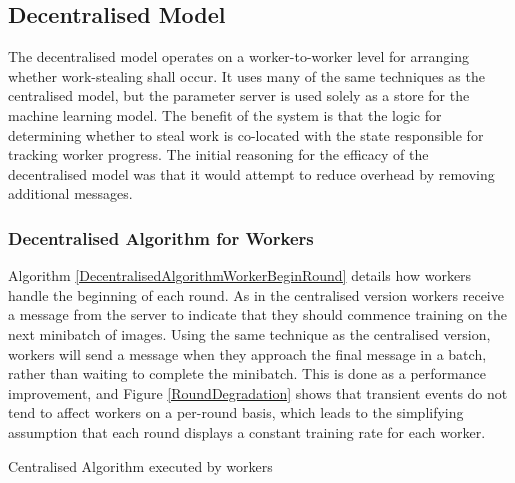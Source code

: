 \documentclass[12pt]{article}
\begin{document}
\subsection{Decentralised Model}
The decentralised model operates on a worker-to-worker level for arranging whether work-stealing shall occur. It uses many of the same techniques as the centralised model, but the parameter server is used solely as a store for the machine learning model.
\newline
The benefit of the system is that the logic for determining whether to steal work is co-located with the state responsible for tracking worker progress. The initial reasoning for the efficacy of the decentralised model was that it would attempt to reduce overhead by removing additional messages.

\subsubsection{Decentralised Algorithm for Workers}

Algorithm \ref{DecentralisedAlgorithmWorkerBeginRound} details how workers handle the beginning of each round. As in the centralised version workers receive a  message from the server to indicate that they should commence training on the next minibatch of images.
\newline
Using the same technique as the centralised version, workers will send a message when they approach the final message in a batch, rather than waiting to complete the minibatch. This is done as a performance improvement, and Figure \ref{RoundDegradation} shows that transient events do not tend to affect workers on a per-round basis, which leads to the simplifying assumption that each round displays a constant training rate for each worker.

\IncMargin{1em}
\begin{algorithm}[H]
 \BlankLine
 \caption{Centralised Algorithm executed by workers}
 \label{DecentralisedAlgorithmWorkerBeginRound}
\end{algorithm}
\DecMargin{1em}
\medskip
\end{document}
